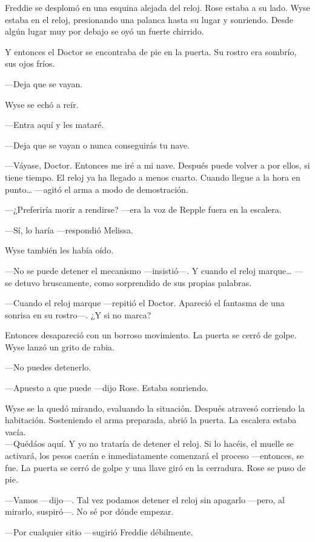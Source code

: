 {Freddie se desplomó en una esquina alejada del reloj. Rose estaba a
	su lado. Wyse estaba en el reloj, presionando una palanca hasta su
	lugar y sonriendo. Desde algún lugar muy por debajo se oyó un fuerte
chirrido.}

{Y entonces el Doctor se encontraba de pie en la puerta. Su rostro
era sombrío, sus ojos fríos.}

{---Deja que se vayan.}

{Wyse se echó a reír.}

{---Entra aquí y les mataré.}

{---Deja que se vayan o nunca conseguirás tu nave.}

{---Váyase, Doctor. Entonces me iré a mi nave. Después puede volver
	a por ellos, si tiene tiempo. El reloj ya ha llegado a menos
	cuarto. Cuando llegue a la hora en punto\ldots{} ---agitó el arma a
modo de demostración.}

{---¿Preferiría morir a rendirse? ---era la voz de Repple fuera en la
escalera.}

{---Sí, lo haría ---respondió Melissa.}

{Wyse también les había oído.}

{---No se puede detener el mecanismo ---insistió---. Y cuando el
	reloj marque\ldots{} ---se detuvo bruscamente, como sorprendido de sus
propias palabras.}

{---Cuando el reloj marque ---repitió el Doctor. Apareció el
fantasma de una sonrisa en su rostro---. ¿Y si no marca?}

{Entonces desapareció con un borroso movimiento. La puerta se cerró
de golpe. Wyse lanzó un grito de rabia.}

{---No puedes detenerlo.}

{---Apuesto a que puede ---dijo Rose. Estaba sonriendo.}

{Wyse se la quedó mirando, evaluando la situación. Después atravesó
	corriendo la habitación. Sosteniendo el arma preparada, abrió la
	puerta. La escalera estaba vacía.\\
	---Quédáos aquí. Y yo no trataría de detener el reloj. Si lo
	hacéis, el muelle se activará, los pesos caerán e inmediatamente
	comenzará el proceso ---entonces, se fue. La puerta se cerró de
golpe y una llave giró en la cerradura. Rose se puso de pie.}

{---Vamos ---dijo---. Tal vez podamos detener el reloj sin apagarlo
---pero, al mirarlo, suspiró---. No sé por dónde empezar.}

{---Por cualquier sitio ---sugirió Freddie débilmente.}

